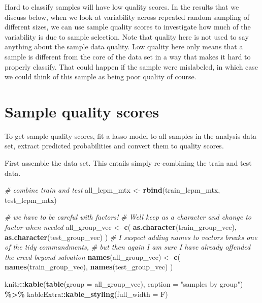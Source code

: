 \documentclass[
]{book}
\newenvironment{Shaded}{\begin{snugshade}}{\end{snugshade}}
\newcommand{\CommentTok}[1]{\textcolor[rgb]{0.56,0.35,0.01}{\textit{#1}}}
\newcommand{\DataTypeTok}[1]{\textcolor[rgb]{0.13,0.29,0.53}{#1}}
\newcommand{\KeywordTok}[1]{\textcolor[rgb]{0.13,0.29,0.53}{\textbf{#1}}}
\newcommand{\NormalTok}[1]{#1}
\newcommand{\OperatorTok}[1]{\textcolor[rgb]{0.81,0.36,0.00}{\textbf{#1}}}
\newcommand{\StringTok}[1]{\textcolor[rgb]{0.31,0.60,0.02}{#1}}
\begin{document}
Hard to classify samples will have low quality scores.
In the results that we discuss below, when we look at variability across repeated
random sampling of different sizes, we can use sample quality scores to investigate
how much of the variability is due to sample selection.
Note that quality here is not used to say anything about the sample data quality.
Low quality here only means that a sample is different from the
core of the data set in a way that makes it hard to properly classify.
That could happen if the sample were mislabeled, in which case we could
think of this sample as being poor quality of course.

\hypertarget{sample-quality-scores}{%
\section{Sample quality scores}\label{sample-quality-scores}}

To get sample quality scores, fit a lasso model to all samples in the
analysis data set, extract predicted probabilities and
convert them to quality scores.

First assemble the data set. This entails simply re-combining the
train and test data.

\begin{Shaded}
\begin{Highlighting}[]
\CommentTok{\# combine train and test }
\NormalTok{all\_lcpm\_mtx <{-}}\StringTok{ }\KeywordTok{rbind}\NormalTok{(train\_lcpm\_mtx, test\_lcpm\_mtx)}

\CommentTok{\# we have to be careful with factors!}
\CommentTok{\# We\textquotesingle{}ll keep as a character and change to factor when needed}
\NormalTok{all\_group\_vec <{-}}\StringTok{ }\KeywordTok{c}\NormalTok{(}
 \KeywordTok{as.character}\NormalTok{(train\_group\_vec), }
 \KeywordTok{as.character}\NormalTok{(test\_group\_vec)}
\NormalTok{)}
\CommentTok{\# I suspect adding names to vectors breaks one of the tidy commandments,}
\CommentTok{\# but then again I am sure I have already offended the creed beyond salvation}
\KeywordTok{names}\NormalTok{(all\_group\_vec) <{-}}\StringTok{ }\KeywordTok{c}\NormalTok{(}
 \KeywordTok{names}\NormalTok{(train\_group\_vec),}
 \KeywordTok{names}\NormalTok{(test\_group\_vec)}
\NormalTok{)}

\NormalTok{knitr}\OperatorTok{::}\KeywordTok{kable}\NormalTok{(}\KeywordTok{table}\NormalTok{(}\DataTypeTok{group =}\NormalTok{ all\_group\_vec),}
  \DataTypeTok{caption =} \StringTok{"samples by group"}\NormalTok{) }\OperatorTok{\%>\%}
\StringTok{   }\NormalTok{kableExtra}\OperatorTok{::}\KeywordTok{kable\_styling}\NormalTok{(}\DataTypeTok{full\_width =}\NormalTok{ F)}
\end{Highlighting}
\end{Shaded}
\end{document}
